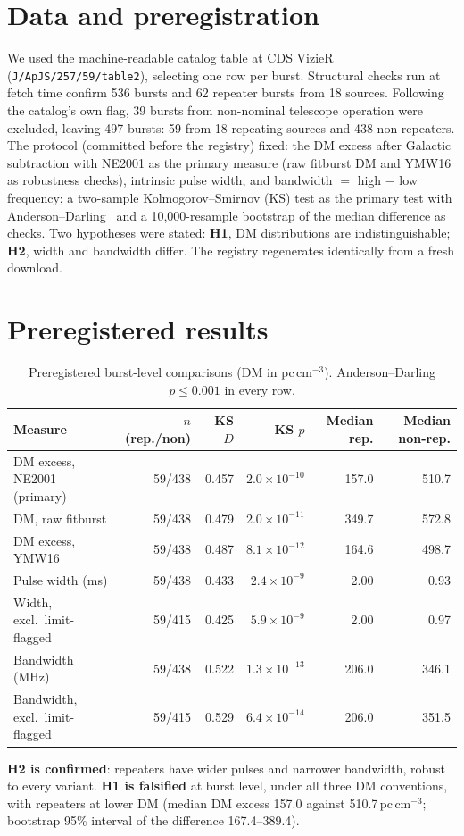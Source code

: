 \documentclass[11pt]{article}
\begin{document}
\section{Data and preregistration}
We used the machine-readable catalog table at CDS VizieR (\texttt{J/ApJS/257/59/table2}), selecting one row per burst.
Structural checks run at fetch time confirm 536 bursts and 62 repeater bursts from 18 sources. Following the catalog's
own flag, 39 bursts from non-nominal telescope operation were excluded, leaving 497 bursts: 59 from 18 repeating
sources and 438 non-repeaters. The protocol (committed before the registry) fixed: the DM excess after Galactic
subtraction with NE2001 as the primary measure (raw fitburst DM and YMW16 as robustness checks), intrinsic pulse width,
and bandwidth $=$ high $-$ low frequency; a two-sample Kolmogorov--Smirnov (KS) test as the primary test with
Anderson--Darling~\cite{scholz1987} and a 10{,}000-resample bootstrap of the median difference as checks. Two
hypotheses were stated: \textbf{H1}, DM distributions are indistinguishable; \textbf{H2}, width and bandwidth differ.
The registry regenerates identically from a fresh download.

\section{Preregistered results}
\begin{table}[h]
\centering\small
\begin{tabular}{lrrrrr}
\toprule
Measure & $n$ (rep./non) & KS $D$ & KS $p$ & Median rep. & Median non-rep.\\
\midrule
DM excess, NE2001 (primary) & 59/438 & 0.457 & $2.0\times10^{-10}$ & 157.0 & 510.7\\
DM, raw fitburst & 59/438 & 0.479 & $2.0\times10^{-11}$ & 349.7 & 572.8\\
DM excess, YMW16 & 59/438 & 0.487 & $8.1\times10^{-12}$ & 164.6 & 498.7\\
Pulse width (ms) & 59/438 & 0.433 & $2.4\times10^{-9}$ & 2.00 & 0.93\\
Width, excl.\ limit-flagged & 59/415 & 0.425 & $5.9\times10^{-9}$ & 2.00 & 0.97\\
Bandwidth (MHz) & 59/438 & 0.522 & $1.3\times10^{-13}$ & 206.0 & 346.1\\
Bandwidth, excl.\ limit-flagged & 59/415 & 0.529 & $6.4\times10^{-14}$ & 206.0 & 351.5\\
\bottomrule
\end{tabular}
\caption{Preregistered burst-level comparisons (DM in pc\,cm$^{-3}$). Anderson--Darling $p\le0.001$ in every row.}
\end{table}
\textbf{H2 is confirmed}: repeaters have wider pulses and narrower bandwidth, robust to every variant. \textbf{H1 is
falsified} at burst level, under all three DM conventions, with repeaters at lower DM (median DM excess 157.0 against
510.7\,pc\,cm$^{-3}$; bootstrap 95\% interval of the difference 167.4--389.4).
\end{document}
